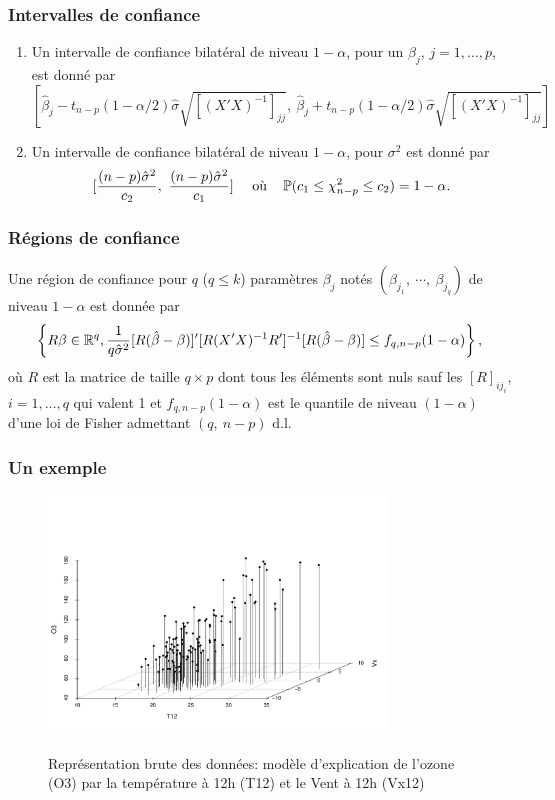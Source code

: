 \begin{frame}
\frametitle{Intervalles de confiance}
\begin{theo}
\begin{enumerate}
\item Un intervalle de confiance bilatéral de niveau $1-\alpha$,  pour un $\beta_{j}$, $j=1,\dots, p$, est donné  par
    $$
    [\hat{\beta}_{j}-t_{n-p}(1-\alpha/2)\hat{\sigma}\sqrt{[(X'X)^{-1}]_{jj}},\ \hat{\beta}_{j}+t_{n-p}(1-\alpha/2)\hat{\sigma}\sqrt{[(X'X)^{-1}]_{jj}}]
    $$
\item Un intervalle de confiance bilatéral de niveau $ 1-\alpha$, pour $\sigma^{2}$  est donné par
$$
[\frac{(n-p)\hat{\sigma}^{2}}{c_{2}},\ \frac{(n-p)\hat{\sigma}^{2}}{c_{1}}]\ \quad \text{où} \quad  \PP(c_{1}\leq\chi_{n-p}^{2}\leq c_{2})=1-\alpha.
$$
\end{enumerate}
\end{theo}
\end{frame}


\begin{frame}
\frametitle{Régions de confiance}
\begin{theo}
 Une région de confiance  pour $q$ ($q\leq k$)  param\`{e}tres $\beta_{j}$ notés $(\beta_{j_{1}},\ \cdots,\ \beta_{j_{q}})$ de niveau
 $ 1-\alpha$ est donn\'{e}e  par
$$
\left\{R\beta \in \mathbb{R}^q, \frac{1}{q\hat{\sigma}^{2}}[R(\hat{\beta}-\beta)]'[R(X'X)^{-1}R']^{-1}[R(\hat{\beta}-\beta)]\leq f_{q,n-p}(1-\alpha)\right\},
$$
o\`{u} $R$ est la matrice de taille $q\times p$ dont tous les éléments sont nuls sauf les $[R]_{ij_{i}}$, $i=1,\dots,q$ qui valent 1 et $f_{q,n-p}(1-\alpha)$ est le quantile de niveau $(1-\alpha)$ d'une loi de Fisher admettant $(q,\ n-p)$ d.l.
\end{theo}
\end{frame}

\begin{frame}
\frametitle{Un exemple}
\begin{figure}
  \centering
  \includegraphics[width=0.8\textwidth]{ScatterPlot}\\
  \caption{Représentation brute des données: modèle d'explication de l'ozone (O3) par la température à 12h (T12) et le Vent à 12h (Vx12)}
\end{figure}
\end{frame}

